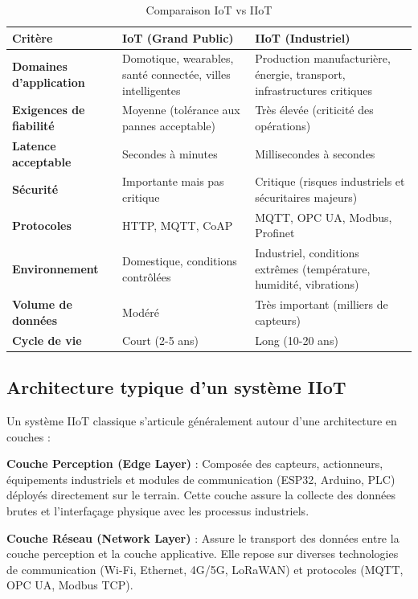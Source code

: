\begin{table}[htbp]
\centering
\small
\caption{Comparaison IoT vs IIoT}
\label{tab:iot_vs_iiot}
\begin{tabular}{|p{3.5cm}|p{5cm}|p{5cm}|}
\hline
\rowcolor{sewesblu!20}
\textbf{Critère} & \textbf{IoT (Grand Public)} & \textbf{IIoT (Industriel)} \\
\hline
\textbf{Domaines d'application} & Domotique, wearables, santé connectée, villes intelligentes & Production manufacturière, énergie, transport, infrastructures critiques \\
\hline
\textbf{Exigences de fiabilité} & Moyenne (tolérance aux pannes acceptable) & Très élevée (criticité des opérations) \\
\hline
\textbf{Latence acceptable} & Secondes à minutes & Millisecondes à secondes \\
\hline
\textbf{Sécurité} & Importante mais pas critique & Critique (risques industriels et sécuritaires majeurs) \\
\hline
\textbf{Protocoles} & HTTP, MQTT, CoAP & MQTT, OPC UA, Modbus, Profinet \\
\hline
\textbf{Environnement} & Domestique, conditions contrôlées & Industriel, conditions extrêmes (température, humidité, vibrations) \\
\hline
\textbf{Volume de données} & Modéré & Très important (milliers de capteurs) \\
\hline
\textbf{Cycle de vie} & Court (2-5 ans) & Long (10-20 ans) \\
\hline
\end{tabular}
\end{table}


\subsection{Architecture typique d'un système IIoT}

Un système IIoT classique s'articule généralement autour d'une architecture en couches :

\textbf{Couche Perception (Edge Layer)} : Composée des capteurs, actionneurs, équipements industriels et modules de communication (ESP32, Arduino, PLC) déployés directement sur le terrain. Cette couche assure la collecte des données brutes et l'interfaçage physique avec les processus industriels.

\textbf{Couche Réseau (Network Layer)} : Assure le transport des données entre la couche perception et la couche applicative. Elle repose sur diverses technologies de communication (Wi-Fi, Ethernet, 4G/5G, LoRaWAN) et protocoles (MQTT, OPC UA, Modbus TCP).

